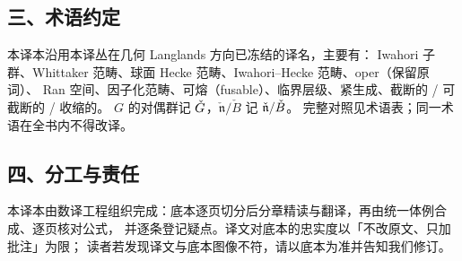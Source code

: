 \subsection*{三、术语约定}

本译本沿用本译丛在几何 Langlands 方向已冻结的译名，主要有：
Iwahori 子群、Whittaker 范畴、球面 Hecke 范畴、Iwahori–Hecke 范畴、oper（保留原词）、
Ran 空间、因子化范畴、可熔（fusable）、临界层级、紧生成、截断的 / 可截断的 / 收缩的。
$G$ 的对偶群记 $\check{G}$，$\check{\mathfrak{n}}/\check B$ 记 $\check{\mathfrak{n}}/\check{B}$。
完整对照见术语表；同一术语在全书内不得改译。

\subsection*{四、分工与责任}

本译本由数译工程组织完成：底本逐页切分后分章精读与翻译，再由统一体例合成、逐页核对公式，
并逐条登记疑点。译文对底本的忠实度以「不改原文、只加批注」为限；
读者若发现译文与底本图像不符，请以底本为准并告知我们修订。
